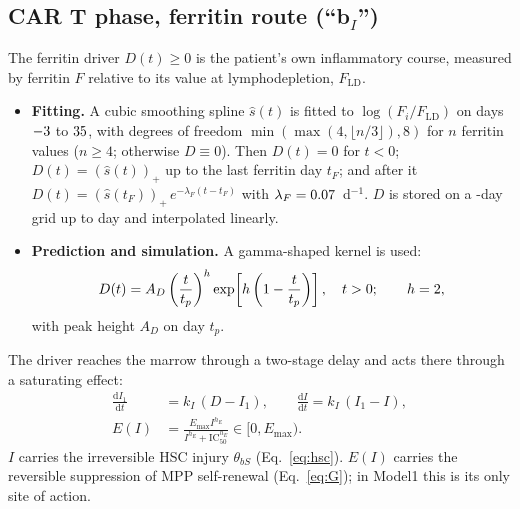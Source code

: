 \documentclass[11pt]{article}
\newcommand{\dd}{\mathrm{d}}
\newcommand{\pos}[1]{\left(#1\right)_{+}}
\begin{document}
\subsection{CAR T phase, ferritin route \texorpdfstring{(``b$_I$'')}{(b-I)}}
The ferritin driver $D(t)\geq 0$ is the patient's own inflammatory course, measured by ferritin $F$ relative to its value at lymphodepletion, $F_{\mathrm{LD}}$.
\begin{itemize}
\item \textbf{Fitting.} A cubic smoothing spline $\hat s(t)$ is fitted to $\log(F_i/F_{\mathrm{LD}})$ on days $-3$ to $35$, with degrees of freedom $\min(\max(4,\lfloor n/3\rfloor),8)$ for $n$ ferritin values ($n\geq4$; otherwise $D\equiv0$). Then $D(t)=0$ for $t<0$; $D(t)=\pos{\hat s(t)}$ up to the last ferritin day $t_F$; and after it $D(t)=\pos{\hat s(t_F)}\,e^{-\lambda_F(t-t_F)}$ with $\lambda_F=0.07$~d$^{-1}$. $D$ is stored on a \valDrvDt-day grid up to day \valDrvEnd{} and interpolated linearly.
\item \textbf{Prediction and simulation.} A gamma-shaped kernel is used:
\begin{equation}
D(t) = A_D\left(\frac{t}{t_p}\right)^{h}\exp\!\left[h\left(1-\frac{t}{t_p}\right)\right],\quad t>0;\qquad h=2, \label{eq:kernel}
\end{equation}
with peak height $A_D$ on day $t_p$.
\end{itemize}
The driver reaches the marrow through a two-stage delay and acts there through a saturating effect:
\begin{align}
\frac{\dd I_1}{\dd t} &= k_I\,(D - I_1), \qquad \frac{\dd I}{\dd t} = k_I\,(I_1 - I), \label{eq:lag}\\
E(I) &= \frac{E_{\max} I^{h_E}}{I^{h_E} + \mathrm{IC}_{50}^{h_E}} \in [0, E_{\max}). \label{eq:E}
\end{align}
$I$ carries the irreversible HSC injury $\theta_{bS}$ (Eq.~\ref{eq:hsc}). $E(I)$ carries the reversible suppression of MPP self-renewal (Eq.~\ref{eq:G}); in Model1 this is its only site of action.
\end{document}
